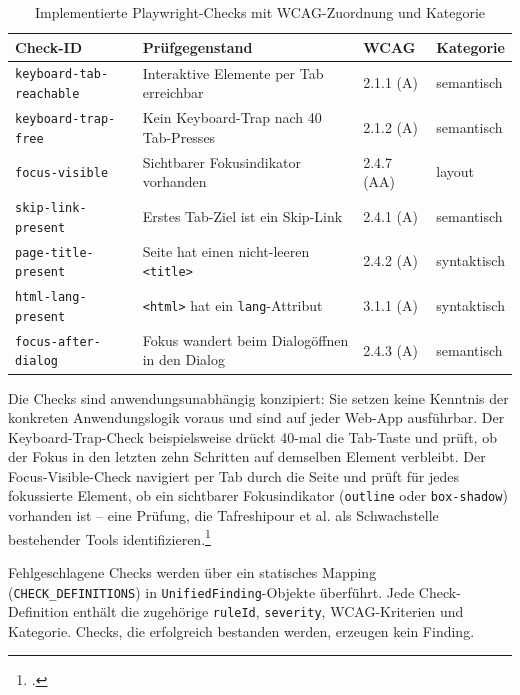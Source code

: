 \begin{table}[H]
\centering
\small
\renewcommand{\arraystretch}{1.15}
\begin{tabular}{@{}llll@{}}
\toprule
\textbf{Check-ID} & \textbf{Prüfgegenstand} & \textbf{WCAG} & \textbf{Kategorie} \\
\midrule
\texttt{keyboard-tab-reachable} & Interaktive Elemente per Tab erreichbar & 2.1.1 (A) & semantisch \\
\texttt{keyboard-trap-free} & Kein Keyboard-Trap nach 40 Tab-Presses & 2.1.2 (A) & semantisch \\
\texttt{focus-visible} & Sichtbarer Fokusindikator vorhanden & 2.4.7 (AA) & layout \\
\texttt{skip-link-present} & Erstes Tab-Ziel ist ein Skip-Link & 2.4.1 (A) & semantisch \\
\texttt{page-title-present} & Seite hat einen nicht-leeren \texttt{<title>} & 2.4.2 (A) & syntaktisch \\
\texttt{html-lang-present} & \texttt{<html>} hat ein \texttt{lang}-Attribut & 3.1.1 (A) & syntaktisch \\
\texttt{focus-after-dialog} & Fokus wandert beim Dialogöffnen in den Dialog & 2.4.3 (A) & semantisch \\
\bottomrule
\end{tabular}
\caption{Implementierte Playwright-Checks mit \ac{WCAG}-Zuordnung und Kategorie}
\label{tab:pw-checks}
\end{table}

Die Checks sind anwendungsunabhängig konzipiert: Sie setzen keine Kenntnis der konkreten Anwendungslogik voraus und sind auf jeder Web-App ausführbar. Der Keyboard-Trap-Check beispielsweise drückt 40-mal die Tab-Taste und prüft, ob der Fokus in den letzten zehn Schritten auf demselben Element verbleibt. Der Focus-Visible-Check navigiert per Tab durch die Seite und prüft für jedes fokussierte Element, ob ein sichtbarer Fokusindikator (\texttt{outline} oder \texttt{box-shadow}) vorhanden ist -- eine Prüfung, die Tafreshipour et al. als Schwachstelle bestehender Tools identifizieren.\footcite[Vgl.][S.~110]{tafreshipour_ma11y_2024}

Fehlgeschlagene Checks werden über ein statisches Mapping (\texttt{CHECK\_DEFINITIONS}) in \texttt{UnifiedFinding}-Objekte überführt. Jede Check-Definition enthält die zugehörige \texttt{ruleId}, \texttt{severity}, \ac{WCAG}-Kriterien und Kategorie. Checks, die erfolgreich bestanden werden, erzeugen kein Finding.

